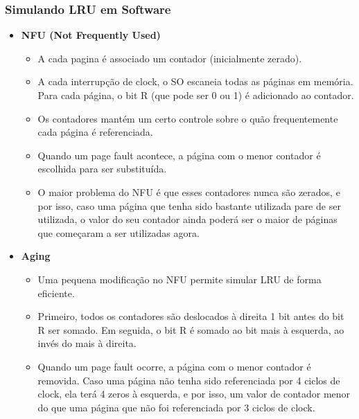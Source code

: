 \documentclass[10pt]{article}
\begin{document}
\subsubsection{Simulando LRU em Software}
\begin{itemize}
    \item \textbf{NFU (Not Frequently Used)}
        \begin{itemize}
            \item A cada pagina é associado um contador (inicialmente zerado).
            \item A cada interrupção de clock, o SO escaneia todas as páginas em
                memória. Para cada página, o bit R (que pode ser 0 ou 1) é adicionado ao 
                contador. 
            \item Os contadores mantém um certo controle sobre o quão frequentemente cada
                página é referenciada.
            \item Quando um page fault acontece, a página com o menor contador é escolhida
                para ser substituída.
            \item O maior problema do NFU é que esses contadores nunca são zerados, e por 
                isso, caso uma página que tenha sido bastante utilizada pare de ser utilizada,
                o valor do seu contador ainda poderá ser o maior de páginas que começaram a 
                ser utilizadas agora.
        \end{itemize}
    \item \textbf{Aging}       
        \begin{itemize}
            \item Uma pequena modificação no NFU permite simular LRU de forma eficiente.
            \item Primeiro, todos os contadores são deslocados à direita 1 bit antes do bit
                R ser somado. Em seguida, o bit R é somado ao bit mais à esquerda, ao invés
                do mais à direita.
            \item Quando um page fault ocorre, a página com o menor contador é removida. 
                Caso uma página não tenha sido referenciada por 4 ciclos de clock, ela 
                terá 4 zeros à esquerda, e por isso, um valor de contador menor do que 
                uma página que não foi referenciada por 3 ciclos de clock.
        \end{itemize}

\end{itemize}
\end{document}
